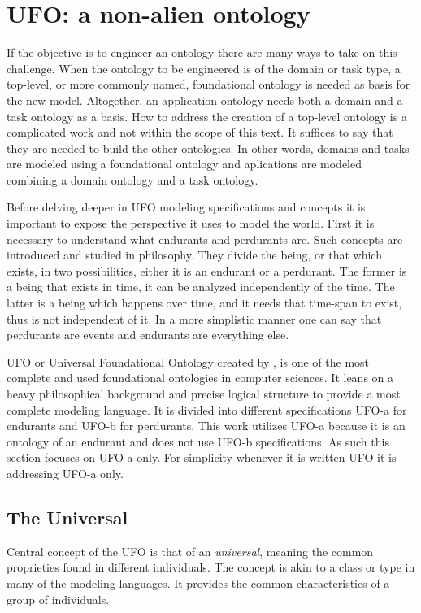 \section{UFO: a non-alien ontology} 

If the objective is to engineer an ontology there are many ways to take on this challenge. When the ontology to be engineered is of the domain or task type, a top-level, or more commonly named, foundational ontology is needed as basis for the new model. Altogether, an application ontology needs both a domain and a task ontology as a basis. How to address the creation of a top-level ontology is a complicated work and not within the scope of this text. It suffices to say that they are needed to build the other ontologies. In other words, domains and tasks are modeled using a foundational ontology and aplications are modeled combining a domain ontology and a task ontology.


Before delving deeper in UFO modeling specifications and concepts it is important to expose the perspective it uses to model the world. First it is necessary to understand what endurants and perdurants are. Such concepts are introduced and studied in philosophy. They divide the being, or that which exists, in two possibilities, either it is an endurant or a perdurant. The former is a being that exists in time, it can be analyzed independently of the time. The latter is a being which happens over time, and it needs that time-span to exist, thus is not independent of it. In a more simplistic manner one can say that perdurants are events and endurants are everything else. 

UFO or Universal Foundational Ontology created by \cite{guizzardi_ontological_2005}, is one of the most complete and used foundational ontologies in computer sciences. It leans on a heavy philosophical background and precise logical structure to provide a most complete modeling language. It is divided into different specifications UFO-a for endurants and UFO-b for perdurants. This work utilizes UFO-a because it is an ontology of an endurant and does not use UFO-b specifications. As such this section focuses on UFO-a only. For simplicity whenever it is written UFO it is addressing UFO-a only.

\subsection{The Universal}

Central concept of the UFO is that of an \textit{universal}, meaning the common proprieties found in different individuals. The concept is akin to a class or type in many of the modeling languages. It provides the common characteristics of a group of individuals. 

